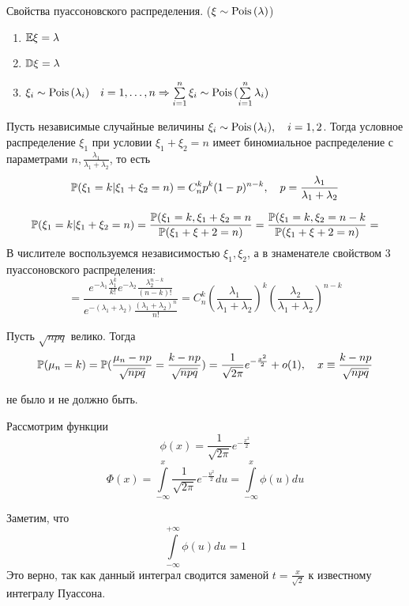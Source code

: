 \documentclass[../TV&MS.tex]{subfiles}
\begin{document}
Свойства пуассоновского распределения. ($\xi \sim {\rm Pois \,}(\lambda)$)
\begin{enumerate}
	\item $\mathbb{E}\xi = \lambda$
	\item $\mathbb{D}\xi = \lambda$
	\item $\xi_i \sim {\rm Pois \,}(\lambda_i) \quad i = 1, \ldots, n \Rightarrow \sum\limits_{i = 1}^{n}\xi_i \sim {\rm Pois \,}(\sum\limits_{i = 1}^{n}\lambda_i)$
\end{enumerate}

\begin{St}
Пусть независимые случайные величины $\xi_i \sim {\rm Pois \,}(\lambda_i), \quad i = 1, 2$. Тогда условное распределение $\xi_1$ при условии $\xi_1 + \xi_2 = n$ имеет биномиальное распределение с параметрами $n, \frac{\lambda_1}{\lambda_1 + \lambda_2}$, то есть
$$\mathbb{P}(\xi_1 = k | \xi_1 + \xi_2 = n) = C_n^kp^k(1-p)^{n-k}, \quad p = \frac{\lambda_1}{\lambda_1 + \lambda_2}$$
\end{St}
\begin{Proof}
$$\mathbb{P}(\xi_1 = k | \xi_1 + \xi_2 = n) = \frac{\mathbb{P}(\xi_1 = k, \xi_1 + \xi_2 = n}{\mathbb{P}(\xi_1 + \xi+2 = n)} = \frac{\mathbb{P}(\xi_1 = k, \xi_2 = n - k}{\mathbb{P}(\xi_1 + \xi+2 = n)}=$$
В числителе воспользуемся независимостью $\xi_1, \xi_2$, а в знаменателе свойством 3 пуассоновского распределения:
$$=\frac{e^{-\lambda_1}\frac{\lambda_1^k}{k!}e^{-\lambda_2}\frac{\lambda_2^{n-k}}{(n-k)!}}{e^{-(\lambda_1+\lambda_2)}\frac{(\lambda_1+\lambda_2)^n}{n!}} = 
C_n^k(\frac{\lambda_1}{\lambda_1 + \lambda_2})^k(\frac{\lambda_2}{\lambda_1 + \lambda_2})^{n-k}$$
\end{Proof}

\begin{Th} 
Пусть $\sqrt{npq}$ велико. Тогда
$$\mathbb{P}(\mu_n = k) = \mathbb{P}(\frac{\mu_n - np}{\sqrt{npq}} = \frac{k - np}{\sqrt{npq}}) = \frac{1}{\sqrt{2\pi}}e^{-\frac{x^2}2} + o(1), \quad x \equiv \frac{k - np}{\sqrt{npq}}$$
\end{Th}
\begin{Proof} не было и не должно быть.
\end{Proof}

Рассмотрим функции
$$\phi(x) = \frac{1}{\sqrt{2\pi}}e^{-\frac{x^2}2}$$
$$\Phi(x) = \int\limits_{-\infty}^x \frac{1}{\sqrt{2\pi}}e^{-\frac{u^2}2} du = \int\limits_{-\infty}^{x}\phi(u)du$$

Заметим, что 
$$\int\limits_{-\infty}^{+\infty} \phi(u)du = 1$$ 
Это верно, так как данный интеграл сводится заменой $t = \frac{x}{\sqrt{2}}$ к известному интегралу Пуассона.
\end{document}
